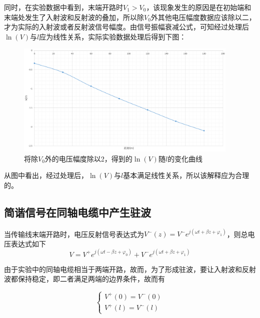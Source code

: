 \documentclass[UTF8]{ctexart}
\begin{document}
同时，在实验数据中看到，末端开路时$V_1>V_0$，该现象发生的原因是在初始端和末端处发生了入射波和反射波的叠加，所以除$V_0$外其他电压幅度数据应该除以二，才为实际的入射波或者反射波信号幅度。由信号振幅衰减公式，可知经过处理后$\ln(V)$与$l$应为线性关系，实际实验数据处理后得到下图：
\begin{figure}[H]
\centering
\includegraphics[width=0.95\textwidth]{D.png}
\caption{将除$V_0$外的电压幅度除以2，得到的$\ln(V)$随$l$的变化曲线}
\end{figure}

从图中看出，经过处理后，$\ln(V)$与$l$基本满足线性关系，所以该解释应为合理的。

\subsection{简谐信号在同轴电缆中产生驻波}
当传输线末端开路时，电压反射信号表达式为$V^-(z)=V^-e^{j(\omega t+\beta z+\varphi_1)}$，则总电压表达式如下
\begin{equation}
V=V^+e^{j(\omega t-\beta z+\varphi_0)}+V^-e^{j(\omega t+\beta z+\varphi_1)}
\end{equation}

由于实验中的同轴电缆相当于两端开路，故而，为了形成驻波，要让入射波和反射波都保持稳定，即二者满足两端的边界条件，故而有

\begin{equation}
\left\{
    \begin{array}{l}
            V^+(0)=V^-(0) \\  V^+(l)=V^-(l)
        \end{array}
\right.
\end{equation}
\end{document}
